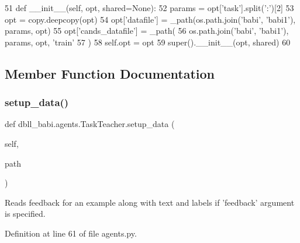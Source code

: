 \begin{DoxyCode}
51     \textcolor{keyword}{def }\_\_init\_\_(self, opt, shared=None):
52         params = opt[\textcolor{stringliteral}{'task'}].split(\textcolor{stringliteral}{':'})[2]
53         opt = copy.deepcopy(opt)
54         opt[\textcolor{stringliteral}{'datafile'}] = \_path(os.path.join(\textcolor{stringliteral}{'babi'}, \textcolor{stringliteral}{'babi1'}), params, opt)
55         opt[\textcolor{stringliteral}{'cands\_datafile'}] = \_path(
56             os.path.join(\textcolor{stringliteral}{'babi'}, \textcolor{stringliteral}{'babi1'}), params, opt, \textcolor{stringliteral}{'train'}
57         )
58         self.opt = opt
59         super().\_\_init\_\_(opt, shared)
60 
\end{DoxyCode}


\subsection{Member Function Documentation}
\mbox{\label{classdbll__babi_1_1agents_1_1TaskTeacher_adcbc1c54716e7b631e4a496f59df1f33}} 
\subsubsection{\texorpdfstring{setup\+\_\+data()}{setup\_data()}}
{\footnotesize\ttfamily def dbll\+\_\+babi.\+agents.\+Task\+Teacher.\+setup\+\_\+data (\begin{DoxyParamCaption}\item[{}]{self,  }\item[{}]{path }\end{DoxyParamCaption})}

\begin{DoxyVerb}Reads feedback for an example along with text and labels if 'feedback' argument
is specified.
\end{DoxyVerb}
 

Definition at line 61 of file agents.\+py.


